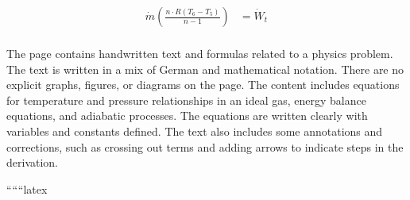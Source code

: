 \begin{align*}
\dot{m} \left( \frac{n \cdot R (T_6 - T_5)}{n-1} \right) &= \dot{W}_t \\
\end{align*}


The page contains handwritten text and formulas related to a physics problem. The text is written in a mix of German and mathematical notation. There are no explicit graphs, figures, or diagrams on the page. The content includes equations for temperature and pressure relationships in an ideal gas, energy balance equations, and adiabatic processes. The equations are written clearly with variables and constants defined. The text also includes some annotations and corrections, such as crossing out terms and adding arrows to indicate steps in the derivation.

``````latex